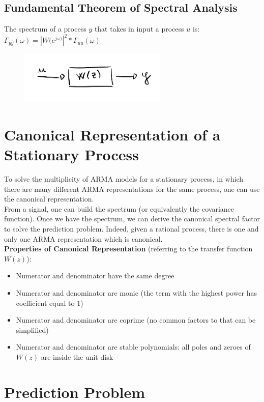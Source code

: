 \documentclass[10pt,a4paper]{article}
\begin{document}
\subsection{Fundamental Theorem of Spectral Analysis}
The spectrum of a process $y$ that takes in input a process $u$ is:
\center 
$\Gamma_{yy}(\omega)=|W(e^{j \omega)}|^2*\Gamma_{uu}(\omega)$
\\
 \begin{figure}[h!]
 \hfill \includegraphics[width=200pt]{images/spectrum-theorem.png}\hspace*{\fill}
  \label{fig:spectrum-theorem}
\end{figure}
\raggedright
\section{Canonical Representation of a Stationary Process}
To solve the multiplicity of ARMA models for a stationary process, in which there are many different ARMA representations for the same process, one can use the canonical representation. \\
From a signal, one can build the spectrum (or equivalently the covariance function). Once we have the spectrum, we can derive the canonical spectral factor to solve the prediction problem. Indeed, given a rational process, there is one and only one ARMA representation which is canonical. \\
\pagebreak
\textbf{Properties of Canonical Representation} (referring to the transfer function $W(z)$):
\begin{itemize}
	\item Numerator and denominator have the same degree
	\item Numerator and denominator are monic (the term with the highest power has coefficient equal to 1)
	\item Numerator and denominator are coprime (no common factors to that can be simplified)
	\item Numerator and denominator are stable polynomials: all poles and zeroes of $W(z)$ are inside the unit disk
\end{itemize}
\section{Prediction Problem}
\end{document}
